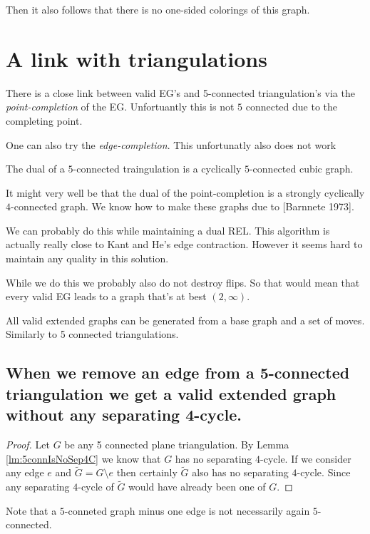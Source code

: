   Then it also follows that there is no one-sided colorings of this graph.


\section{A link with triangulations}

  There is a close link between valid EG's and 5-connected triangulation's via the \emph{point-completion} of the EG. Unfortuantly this is not $5$ connected due to the completing point.


  One can also try the \emph{edge-completion}. This unfortunatly also does not work

  The dual of a $5$-connected traingulation is a cyclically $5$-connected cubic graph.

  It might very well be that the dual of the point-completion is a strongly cyclically $4$-connected graph. We know how to make these graphs due to [Barnnete 1973].

  We can probably do this while maintaining a dual REL. This algorithm is actually really close to Kant and He's edge contraction. However it seems hard to maintain any quality in this solution.

  While we do this we probably also do not destroy flips. So that would mean that every valid EG leads to a graph that's at best $(2, \infty)$.


  \begin{con}
    All valid extended graphs can be generated from a base graph and a set of moves. Similarly to 5 connected triangulations.
  \end{con}


  \subsection{When we remove an edge from a 5-connected triangulation we get a valid extended graph without any separating 4-cycle.}

  \begin{proof}
    Let $G$ be any 5 connected plane triangulation. By Lemma \ref{lm:5connIsNoSep4C} we know that $G$ has no separating $4$-cycle. If we consider any edge $e$ and $\tilde{G} = G \setminus{e}$ then certainly $\tilde{G}$ also has no separating $4$-cycle. Since any separating $4$-cycle of $\tilde{G}$ would have already been one of $G$.
  \end{proof}

  Note that a $5$-conneted graph minus one edge is not necessarily again $5$-connected.

